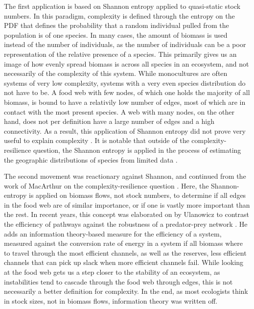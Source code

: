 \documentclass[../main.tex]{subfiles}
\begin{document}
The first application is based on Shannon entropy applied to quasi-static stock numbers.
In this paradigm, complexity is defined through the entropy on the PDF that defines the probability that a random individual pulled from the population is of one species.
In many cases, the amount of biomass is used instead of the number of individuals, as the number of individuals can be a poor representation of the relative presence of a species.
This primarily gives us an image of how evenly spread biomass is across all species in an ecosystem, and not necessarily of the complexity of this system.
While monocultures are often systems of very low complexity, systems with a very even species distribution do not have to be.
A food web with few nodes, of which one holds the majority of all biomass, is bound to have a relativily low number of edges, most of which are in contact with the most present species.
A web with many nodes, on the other hand, does not per definition have a large number of edges and a high connectivity.
As a result, this application of Shannon entropy did not prove very useful to explain complexity \cite{ulanowicz2001information}.
It is notable that outside of the complexity-resilience question, the Shannon entropy is applied in the process of estimating the geographic distributions of species from limited data \cite{phillips2006maximum}. %

The second movement was reactionary against Shannon, and continued from the work of MacArthur on the complexity-resilience question \cite{ulanowicz2009quantifying}.
Here, the Shannon-entropy is applied on biomass flows, not stock numbers, to determine if all edges in the food web are of similar importance, or if one is vastly more important than the rest.
In recent years, this concept was elaborated on by Ulanowicz to contrast the efficiency of pathways against the robustness of a predator-prey network \cite{ulanowicz2009quantifying}.
He adds an information theory-based measure for the efficiency of a system, measured against the conversion rate of energy in a system if all biomass where to travel through the most efficient channels, as well as the reserves, less efficient channels that can pick up slack when more efficient channels fail.
While looking at the food web gets us a step closer to the stability of an ecosystem, as instabilities tend to cascade through the food web through edges, this is not necessarily a better definition for complexity.
In the end, as most ecologists think in stock sizes, not in biomass flows, information theory was written off.
\end{document}
